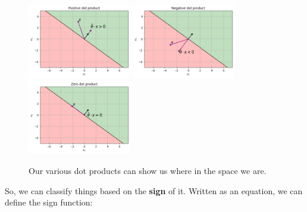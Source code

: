         \begin{figure}[H]
        
                \includegraphics[width=45mm,scale=0.3]{images/classification_images/positive_v_vector_theta_hat.png}
                \includegraphics[width=45mm,scale=0.3]{images/classification_images/negative_v_vector_theta_hat.png}
                \includegraphics[width=45mm,scale=0.3]{images/classification_images/zero_v_vector_theta_hat.png}
                
                \caption*{Our various dot products can show us where in the space we are.}
        \end{figure}        
        
        So, we can classify things based on the \textbf{sign} of it. Written as an equation, we can define the sign function:\\
        
